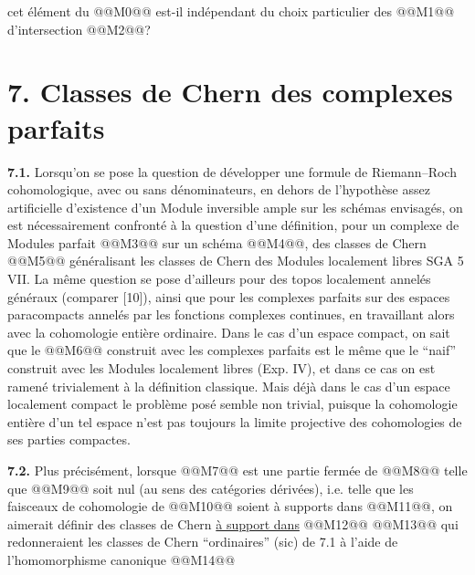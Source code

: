 
cet
élément du @@M0@@ est-il indépendant du choix particulier des @@M1@@ d'intersection @@M2@@?

\section*{7. Classes de Chern des complexes parfaits}

\textbf{7.1.} Lorsqu'on se pose la question de développer une formule de Riemann--Roch cohomologique, avec ou sans dénominateurs, en dehors de l'hypothèse assez artificielle d'existence d'un Module inversible ample sur les schémas envisagés, on est nécessairement confronté à la question d'une définition, pour un complexe de Modules parfait @@M3@@ sur un schéma @@M4@@, des classes de Chern
@@M5@@
généralisant les classes de Chern des Modules localement libres SGA 5 VII. La même question se pose d'ailleurs pour des topos localement annelés généraux (comparer [10]), ainsi que pour les complexes parfaits sur des espaces paracompacts annelés par les fonctions complexes continues, en travaillant alors avec la cohomologie entière ordinaire. Dans le cas d'un espace compact, on sait que le @@M6@@ construit avec les complexes parfaits est le même que le ``naif'' construit avec les Modules localement libres (Exp. IV), et dans ce cas on est ramené trivialement à la définition classique. Mais déjà dans le cas d'un espace localement compact le problème posé semble non trivial, puisque la cohomologie entière d'un tel espace n'est pas toujours la limite projective des cohomologies de ses parties compactes.

\textbf{7.2.} Plus précisément, lorsque @@M7@@ est une partie fermée de @@M8@@ telle que @@M9@@ soit nul (au sens des catégories dérivées), i.e. telle que les faisceaux de cohomologie de @@M10@@ soient à supports dans @@M11@@, on aimerait définir des classes de Chern \uline{à support dans} @@M12@@
@@M13@@
qui redonneraient les classes de Chern ``ordinaires'' (sic) de 7.1 à l'aide de l'homomorphisme canonique
@@M14@@
